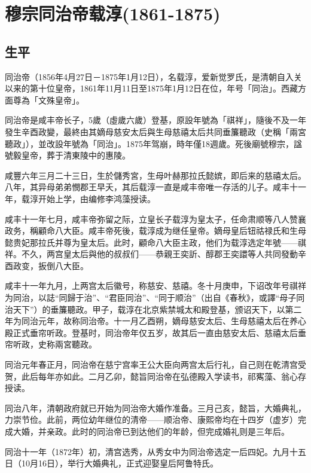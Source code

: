 
\section{穆宗同治帝载淳\tiny(1861-1875)}

\subsection{生平}

同治帝（1856年4月27日－1875年1月12日），名载淳，爱新觉罗氏，是清朝自入关以来的第十位皇帝，1861年11月11日至1875年1月12日在位，年号「同治」。西藏方面尊為「文殊皇帝」。

同治帝是咸丰帝长子，5歲（虛歲六歲）登基，原設年號為「祺祥」，隨後不及一年發生辛酉政變，最終由其嫡母慈安太后與生母慈禧太后共同垂簾聽政（史稱「兩宮聽政」），並改設年號為「同治」。1875年驾崩，時年僅18週歲。死後廟號穆宗，諡號毅皇帝，葬于清東陵中的惠陵。

咸豐六年三月二十三日，生於儲秀宮，生母叶赫那拉氏懿嫔，即后来的慈禧太后。八年，其异母弟弟憫郡王早夭，其后载淳一直是咸丰帝唯一存活的儿子。咸丰十一年，载淳开始上学，由编修李鸿藻授读。

咸丰十一年七月，咸丰帝弥留之际，立皇长子载淳为皇太子，任命肃顺等八人赞襄政务，稱顧命八大臣。咸丰帝死後，载淳成为继任皇帝。嫡母皇后钮祜禄氏和生母懿贵妃那拉氏并尊为皇太后。此时，顧命八大臣主政，他们为载淳选定年號——祺祥。不久，两宫皇太后與他的叔叔们——恭親王奕訢、醇郡王奕譞等人共同發動辛酉政变，扳倒八大臣。

咸丰十一年九月，上两宫太后徽号，称慈安、慈禧。冬十月庚申，下诏改年号祺祥为同治，以誌“同歸于治”、“君臣同治”、“同于顺治”（出自《春秋》，或譯“母子同治天下”）的垂簾聽政。甲子，载淳在北京紫禁城太和殿登基，颁诏天下，以第二年为同治元年，故称同治帝。十一月乙酉朔，嫡母慈安太后、生母慈禧太后在养心殿正式垂帘听政。登基时，同治帝年仅五岁，故其后一直由慈安太后、慈禧太后垂帘听政，史称兩宮聽政。

同治元年春正月，同治帝在慈宁宫率王公大臣向两宫太后行礼，自己则在乾清宫受贺，此后每年亦如此。二月乙卯，懿旨同治帝在弘德殿入学读书，祁寯藻、翁心存授读。

同治八年，清朝政府就已开始为同治帝大婚作准备。三月己亥，懿旨，大婚典礼，力崇节俭。此前，两位幼年继位的清帝——顺治帝、康熙帝均在十四岁（虚岁）完成大婚，并亲政。此时的同治帝已到达他们的年龄，但完成婚礼则是三年后。

同治十一年（1872年）初，清宫选秀，从秀女中为同治帝选定一后四妃。九月十五日（10月16日），举行大婚典礼，正式迎娶皇后阿鲁特氏。


